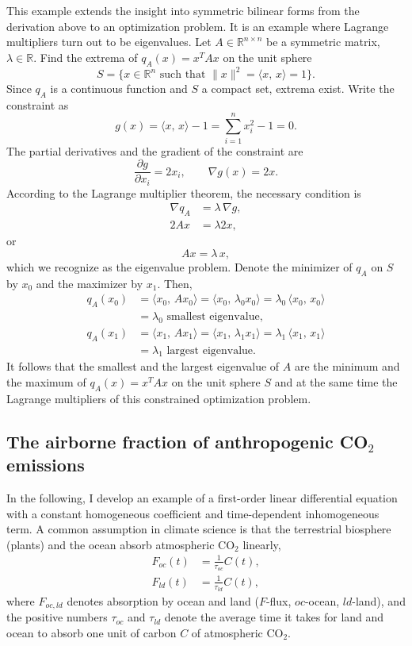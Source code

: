 \documentclass[10pt]{article}
\newcommand{\R}{\mathds{R}}
\begin{document}
This example extends the insight into symmetric bilinear forms from the derivation above to an optimization problem. It is an example where Lagrange multipliers turn out to be eigenvalues.  Let $A\in\R^{n\times n}$ be a symmetric matrix, $\lambda\in\R$. Find the extrema of $q_A(x) = x^T Ax$ on the unit sphere
    \[
        S = \{x\in\R^n \mbox{ such that } \|x\|^2 = \langle x,\, x\rangle = 1\}.
    \]
    Since $q_A$ is a continuous function and $S$ a compact set, extrema exist. Write the constraint as
    \[
        g(x) = \langle x,\, x\rangle - 1 = \sum_{i=1}^n x_i^2 - 1 = 0.
    \]
    The partial derivatives and the gradient of the constraint are
    \[
        \frac{\partial g}{\partial x_i} = 2x_i,\qquad \nabla g(x) = 2x.
    \]
   According to the Lagrange multiplier theorem, the necessary condition
    is
    \begin{align*}
    \nabla q_A &= \lambda \, \nabla g,\\
    2Ax &= \lambda 2x,
    \end{align*}
    or
    \[
    \displaystyle Ax = \lambda\, x,
    \]
    which we recognize as the eigenvalue problem. Denote the minimizer of
    $q_A$ on $S$ by $x_0$ and the maximizer by $x_1$.  Then,
    \begin{align*}
    q_A(x_0) &= \langle x_0,\, A x_0\rangle = \langle x_0,\, \lambda_0 x_0 \rangle = \lambda_0\, \langle x_0,\, x_0 \rangle\\
             &= \lambda_0 \mbox{ smallest eigenvalue},\\
    q_A(x_1) &= \langle x_1,\, A x_1\rangle = \langle x_1,\, \lambda_1 x_1 \rangle = \lambda_1\, \langle x_1,\, x_1 \rangle\\
             &= \lambda_1 \mbox{ largest eigenvalue}.
    \end{align*}
    It follows that the smallest and the largest eigenvalue of $A$ are the minimum and the maximum of $q_A(x) = x^T Ax$ on the unit sphere $S$ and at the same time the Lagrange multipliers of this constrained optimization problem.

\subsection{The airborne fraction of anthropogenic CO$_2$ emissions}

In the following, I develop an example of a first-order linear differential equation with a constant homogeneous coefficient and time-dependent inhomogeneous term. A common assumption in climate science is that the terrestrial biosphere (plants) and the ocean absorb atmospheric CO$_2$ linearly,
\begin{align*}
F_{oc}(t) &= \frac{1}{\tau_{oc}} C(t), \\
F_{ld}(t) &= \frac{1}{\tau_{ld}} C(t),
\end{align*}
where $F_{oc,ld}$ denotes absorption by ocean and land ($F$-flux, $oc$-ocean, $ld$-land), and the positive numbers $\tau_{oc}$ and $\tau_{ld}$ denote the average time it takes for land and ocean to absorb one unit of carbon $C$ of atmospheric CO$_2$. 
\end{document}
